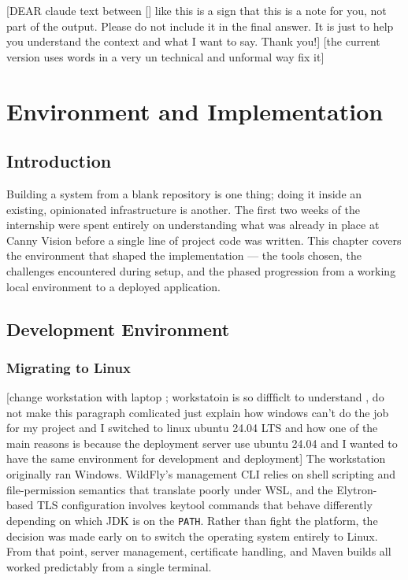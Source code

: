 [DEAR claude text between [] like this is a sign that this is a note for you, not part of the output. Please do not include it in the final answer. It is just to help you understand the context and what I want to say. Thank you!]
[the current version uses words in a very un technical and unformal way fix it]
\chapter{Environment and Implementation}

\section{Introduction}

Building a system from a blank repository is one thing; doing it inside an existing,
opinionated infrastructure is another. The first two weeks of the internship were spent
entirely on understanding what was already in place at Canny Vision before a single line
of project code was written. This chapter covers the environment that shaped the
implementation --- the tools chosen, the challenges encountered during setup, and the
phased progression from a working local environment to a deployed application.

\section{Development Environment}

\subsection{Migrating to Linux}
[change workstation with laptop ; workstatoin is so diffficlt to understand , do not make this paragraph comlicated just explain how windows
 can't do the job for my project and I switched to linux ubuntu 24.04 LTS and how one of the main reasons is because the deployment server use ubuntu 24.04 
 and I wanted to have the same environment for development and deployment]
The workstation originally ran Windows. WildFly's management CLI relies on shell scripting
and file-permission semantics that translate poorly under WSL, and the Elytron-based TLS
configuration involves keytool commands that behave differently depending on which JDK is
on the \texttt{PATH}. Rather than fight the platform, the decision was made early on to
switch the operating system entirely to Linux. From that point, server management,
certificate handling, and Maven builds all worked predictably from a single terminal.

